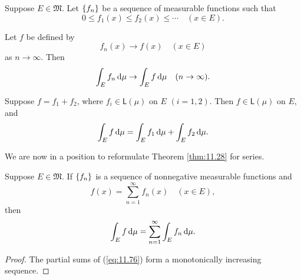 \begin{thm}
    \label{thm:11.28}
    Suppose $E \in \mathfrak{M}$. Let $\protect\{f_n\}$ be
    a sequence of measurable functions such that
    \begin{equation}
        \label{eq:11.64}
        0 \leq f_1(x) \leq f_2(x) \leq \cdots
        \quad (x \in E).
    \end{equation}

    Let $f$ be defined by
    \begin{equation}
        \label{eq:11.65}
        f_n(x) \rightarrow f(x)
        \quad (x \in E)
    \end{equation}
    as $n \rightarrow \infty$.
    Then
    \begin{equation}
        \label{eq:11.66}
        \int_E f_n \d \mu \rightarrow
        \int_E f \d \mu
        \quad (n \rightarrow \infty).
    \end{equation}
\end{thm}

\begin{thm}
    \label{thm:11.29}
    Suppose $f = f_1 + f_2$, where $f_i \in \mathsf{L}(\mu)$ on $E$ $(i = 1,2)$.
    Then $f \in \mathsf{L}(\mu)$ on $E$, and
    \begin{equation}
        \label{eq:11.73}
        \int_E f \d \mu =
        \int_E f_1 \d \mu +
        \int_E f_2 \d \mu .
    \end{equation}
\end{thm}

We are now in a position to reformulate Theorem \ref{thm:11.28} for series.

\begin{thm}
    \label{thm:11.30}
    Suppose $E \in \mathfrak{M}$.
    If $\protect\{f_n\}$ is a sequence of nonnegative measurable functions and
    \begin{equation}
        \label{eq:11.76}
        f(x) = \sum_{n=1}^{\infty} f_n (x)
        \quad (x \in E),
    \end{equation}
    then
    \begin{equation*}
        \int_E f \d \mu =
        \sum_{n=1}^{\infty} \int_E f_n \d \mu .
    \end{equation*}
\end{thm}

\begin{proof}
    The partial sums of (\ref{eq:11.76}) form a monotonically increasing sequence.
\end{proof}

